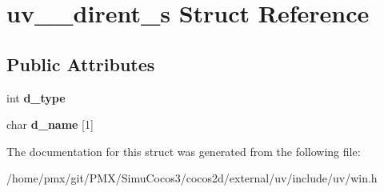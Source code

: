 \hypertarget{structuv____dirent__s}{}\section{uv\+\_\+\+\_\+dirent\+\_\+s Struct Reference}
\label{structuv____dirent__s}
\subsection*{Public Attributes}
\begin{DoxyCompactItemize}
\item 
\mbox{\label{structuv____dirent__s_af97fadd6aed93d41a64006cff96dbab0}} 
int {\bfseries d\+\_\+type}
\item 
\mbox{\label{structuv____dirent__s_affba4e11f07f14d7e2128f999c709278}} 
char {\bfseries d\+\_\+name} \mbox{[}1\mbox{]}
\end{DoxyCompactItemize}


The documentation for this struct was generated from the following file\+:\begin{DoxyCompactItemize}
\item 
/home/pmx/git/\+P\+M\+X/\+Simu\+Cocos3/cocos2d/external/uv/include/uv/win.\+h\end{DoxyCompactItemize}
